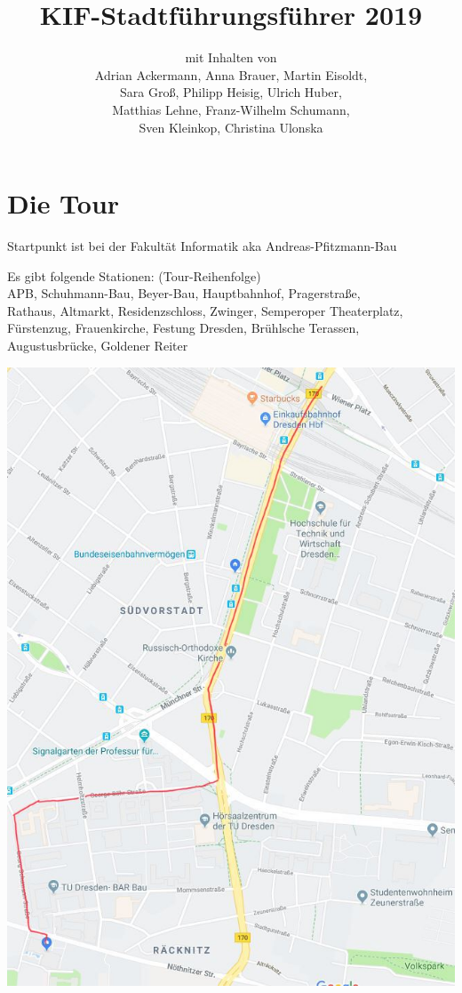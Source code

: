 \documentclass[a4paper,12pt]{report}
\begin{document}
\title{\textbf{KIF-Stadtführungsführer 2019}\\}
\date{}
\author{mit Inhalten von\\Adrian Ackermann, Anna Brauer, Martin Eisoldt,\\Sara Groß, Philipp Heisig, Ulrich Huber,\\ Matthias Lehne, Franz-Wilhelm Schumann, \\ Sven Kleinkop, Christina Ulonska}
\maketitle



\section{Die Tour}
\begin{itemize*}
\item Startpunkt ist bei der Fakultät Informatik aka Andreas-Pfitzmann-Bau
\item Es gibt folgende Stationen: (Tour-Reihenfolge)\\APB, Schuhmann-Bau, Beyer-Bau, Hauptbahnhof, Pragerstraße, \\ Rathaus, Altmarkt, Residenzschloss, Zwinger, Semperoper  Theaterplatz, \\Fürstenzug, Frauenkirche, Festung Dresden, Brühlsche Terassen,\\ Augustusbrücke,  Goldener Reiter\\
\end{itemize*}
\includegraphics[width=\linewidth]{./toureins.jpg}
\end{document}
